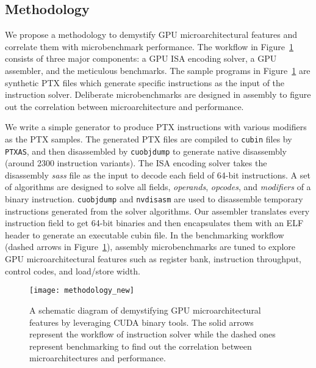 \subsection{Methodology}


We propose a methodology to demystify GPU microarchitectural features and correlate them with microbenchmark performance.
The workflow in Figure~\ref{fig:workflow} consists of three major components: a GPU ISA encoding solver, a GPU assembler, and the meticulous benchmarks.
The sample programs in Figure~\ref{fig:workflow} are synthetic PTX files which generate specific instructions as the input of the instruction solver.
Deliberate microbenchmarks are designed in assembly to figure out the correlation between microarchitecture and performance.

We write a simple generator to produce PTX instructions with various modifiers as the PTX samples.
The generated PTX files are compiled to {\tt cubin} files by {\tt PTXAS}, and
then disassembled by {\tt cuobjdump} to generate native disassembly (around 2300 instruction variants). 
The ISA encoding solver takes the disassembly {\em sass} file as the input to decode each field of 64-bit instructions.
A set of algorithms are designed to solve all fields, {\em operands}, {\em opcodes}, and {\em modifiers} of a binary instruction.
{\tt cuobjdump} and {\tt nvdisasm} are used to disassemble temporary instructions generated from the solver algorithms.
Our assembler translates every instruction field to get 64-bit binaries and then encapsulates them with an ELF header to generate an executable cubin file.
In the benchmarking workflow (dashed arrows in Figure~\ref{fig:workflow}), assembly microbenchmarks are tuned to explore GPU microarchitectural features such as register bank, instruction throughput, control codes, and load/store width.


\begin{figure}[htbp]
\begin{center}
    \texttt{[image: methodology\_new]}
\caption{\small A schematic diagram of demystifying GPU microarchitectural features by leveraging CUDA binary tools. The solid arrows
    represent the workflow of instruction solver while the dashed ones represent benchmarking to find out the correlation between microarchitectures and performance.}
\label{fig:workflow}
\end{center}
\end{figure}
